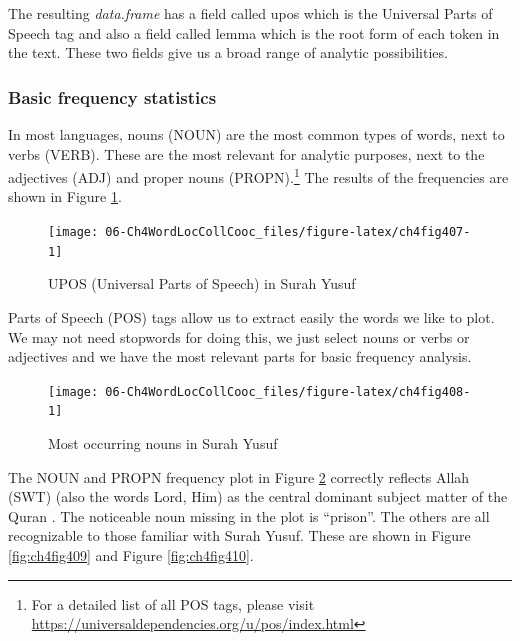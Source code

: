 \documentclass[
]{article}
\begin{document}
\normalsize

The resulting \emph{data.frame} has a field called upos which is the Universal Parts of Speech tag and also a field called lemma which is the root form of each token in the text. These two fields give us a broad range of analytic possibilities.

\hypertarget{basic-frequency-statistics}{%
\subsubsection{Basic frequency statistics}\label{basic-frequency-statistics}}

In most languages, nouns (NOUN) are the most common types of words, next to verbs (VERB). These are the most relevant for analytic purposes, next to the adjectives (ADJ) and proper nouns (PROPN).\footnote{For a detailed list of all POS tags, please visit \url{https://universaldependencies.org/u/pos/index.html}} The results of the frequencies are shown in Figure \ref{fig:ch4fig407}.

\begin{figure}

{\centering \texttt{[image: 06-Ch4WordLocCollCooc\_files/figure-latex/ch4fig407-1]} 

}

\caption{UPOS (Universal Parts of Speech) in Surah Yusuf}\label{fig:ch4fig407}
\end{figure}

Parts of Speech (POS) tags allow us to extract easily the words we like to plot. We may not need stopwords for doing this, we just select nouns or verbs or adjectives and we have the most relevant parts for basic frequency analysis.

\begin{figure}

{\centering \texttt{[image: 06-Ch4WordLocCollCooc\_files/figure-latex/ch4fig408-1]} 

}

\caption{Most occurring nouns in Surah Yusuf}\label{fig:ch4fig408}
\end{figure}

The NOUN and PROPN frequency plot in Figure \ref{fig:ch4fig408} correctly reflects Allah (SWT) (also the words Lord, Him) as the central dominant subject matter of the Quran \citep{alsuwaidan2021}. The noticeable noun missing in the plot is ``prison''. The others are all recognizable to those familiar with Surah Yusuf. These are shown in Figure \ref{fig:ch4fig409} and Figure \ref{fig:ch4fig410}.
\end{document}
